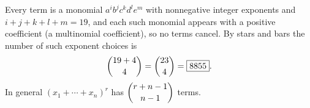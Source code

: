 Every term is a monomial $a^{i}b^{j}c^{k}d^{l}e^{m}$ with nonnegative integer exponents and $i+j+k+l+m=19$, and each such monomial appears with a positive coefficient (a multinomial coefficient), so no terms cancel. By stars and bars the number of such exponent choices is
\[
\dbinom{19+4}{4}=\dbinom{23}{4}=\boxed{8855}.
\]
In general $(x_1+\cdots+x_n)^r$ has $\dbinom{r+n-1}{n-1}$ terms.
